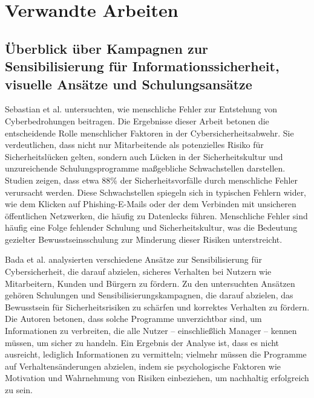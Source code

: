 \documentclass[german,report]{i1thesis}
\begin{document}
\section{Verwandte Arbeiten}
\label{sec:related_work}

\subsection{Überblick über Kampagnen zur Sensibilisierung für Informationssicherheit, visuelle Ansätze und Schulungsansätze}

Sebastian et al. \cite{sebastian2021rethinking} untersuchten, wie menschliche Fehler zur Entstehung von Cyberbedrohungen beitragen. Die Ergebnisse dieser Arbeit betonen die entscheidende Rolle menschlicher Faktoren in der Cybersicherheitsabwehr. Sie verdeutlichen, dass nicht nur Mitarbeitende als potenzielles Risiko für Sicherheitslücken gelten, sondern auch Lücken in der Sicherheitskultur und unzureichende Schulungsprogramme maßgebliche Schwachstellen darstellen. Studien zeigen, dass etwa 88\% der Sicherheitsvorfälle durch menschliche Fehler verursacht werden. Diese Schwachstellen spiegeln sich in typischen Fehlern wider, wie dem Klicken auf Phishing-E-Mails oder der dem Verbinden mit unsicheren öffentlichen Netzwerken, die häufig zu Datenlecks führen. Menschliche Fehler sind häufig eine Folge fehlender Schulung und Sicherheitskultur, was die Bedeutung gezielter Bewusstseinsschulung zur Minderung dieser Risiken unterstreicht.

Bada et al. \cite{bada2019cyber} analysierten verschiedene Ansätze zur Sensibilisierung für Cybersicherheit, die darauf abzielen, sicheres Verhalten bei Nutzern wie Mitarbeitern, Kunden und Bürgern zu fördern. Zu den untersuchten Ansätzen gehören Schulungen und Sensibilisierungskampagnen, die darauf abzielen, das Bewusstsein für Sicherheitsrisiken zu schärfen und korrektes Verhalten zu fördern. Die Autoren betonen, dass solche Programme unverzichtbar sind, um Informationen zu verbreiten, die alle Nutzer – einschließlich Manager – kennen müssen, um sicher zu handeln. Ein Ergebnis der Analyse ist, dass es nicht ausreicht, lediglich Informationen zu vermitteln; vielmehr müssen die Programme auf Verhaltensänderungen abzielen, indem sie psychologische Faktoren wie Motivation und Wahrnehmung von Risiken einbeziehen, um nachhaltig erfolgreich zu sein.
\end{document}
